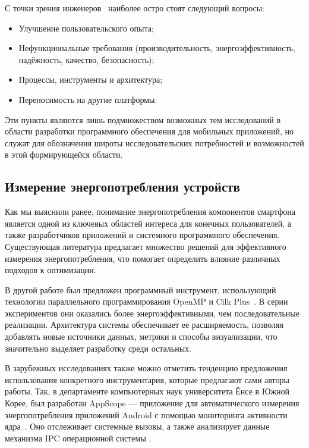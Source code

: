 \documentclass[a4paper,14pt]{extarticle} %
\begin{document}
	С точки зрения инженеров~\parencite{wasserman2010software} наиболее остро стоят следующий вопросы: 
	\begin{itemize}
		\item Улучшение пользовательского опыта; 
		\item Нефункциональные требования (производительность, энергоэффективность, надёжность, качество, безопасность);
		\item Процессы, инструменты и архитектура; 
		\item Переносимость на другие платформы. 
	\end{itemize}

	Эти пункты являются лишь подмножеством возможных тем исследований в области разработки программного обеспечения для мобильных приложений, но служат для обозначения широты исследовательских потребностей и возможностей в этой формирующейся области.
	
	\subsection{Измерение энергопотребления устройств}

	Как мы выяснили ранее, понимание энергопотребления компонентов смартфона является одной из ключевых областей интереса для конечных пользователей, а также разработчиков приложений и системного программного обеспечения. Существующая литература предлагает множество решений для эффективного измерения энергопотребления, что помогает определить влияние различных подходов к оптимизации.
	
	В другой работе был предложен программный инструмент, использующий технологии параллельного программирования OpenMP и Cilk Plus~\parencite{калачев2013разработка}. В серии экспериментов они оказались более энергоэффективными, чем последовательные реализации. Архитектура системы обеспечивает ее расширяемость, позволяя добавлять новые источники данных, метрики и способы визуализации, что значительно выделяет разработку среди остальных.
	
	В зарубежных исследованиях также можно отметить тенденцию предложения использования конкретного инструментария, которые предлагают сами авторы работы. Так, в департаменте компьютерных наук университета Ёнсе в Южной Корее, был разработан AppScope — приложение для автоматического измерения энергопотребления приложений Android с помощью мониторинга активности ядра~\parencite{yoon2012appscope}. Оно отслеживает системные вызовы, а также анализирует данные механизма IPC операционной системы . 
	
\end{document}
